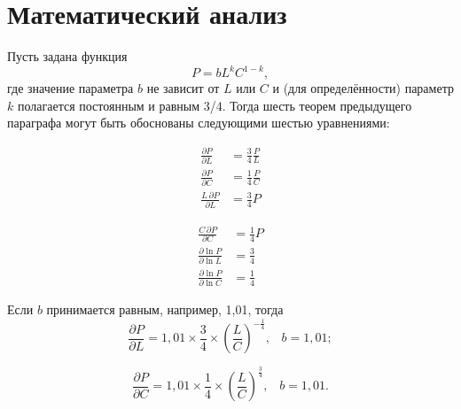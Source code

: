 \documentclass[leqno]{article}  %
\begin{document}
\section{Математический анализ}

Пусть задана функция
\[P=bL^kC^{1-k},\]
где значение параметра \(b\) не зависит от \(L\) или \(C\) и (для определённости) параметр \(k\) полагается постоянным и равным 3/4. Тогда шесть теорем предыдущего параграфа могут быть обоснованы следующими шестью уравнениями:
\begin{multicols}{2}
\begin{align}
\frac{\partial P}{\partial L} &= \frac34 \frac{P}{L}\\
\frac{\partial P}{\partial C} &= \frac14 \frac{P}{C}\\
\frac{L\,\partial P}{\partial L} &= \frac34 P
\end{align}

\begin{align}
\frac{C\,\partial P}{\partial C} &= \frac14 P\\
\frac{\partial \ln P}{\partial \ln L} &= \frac34\\
\frac{\partial \ln P}{\partial \ln C} &= \frac14
\end{align}
\end{multicols}

Если \(b\) принимается равным, например, 1,01, тогда
\begin{equation}
\label{eq:eq7}
\frac{\partial P}{\partial L}=1,\!01 \times \frac34 \times \left(\frac{L}{C}\right)^{-\frac14}\text{,} \quad b=1,\!01;
\end{equation}

\begin{equation}
\label{eq:eq8}
\frac{\partial P}{\partial C}=1,\!01 \times \frac14 \times \left(\frac{L}{C}\right)^\frac34\text{,} \quad b=1,\!01.
\end{equation}
\end{document}

